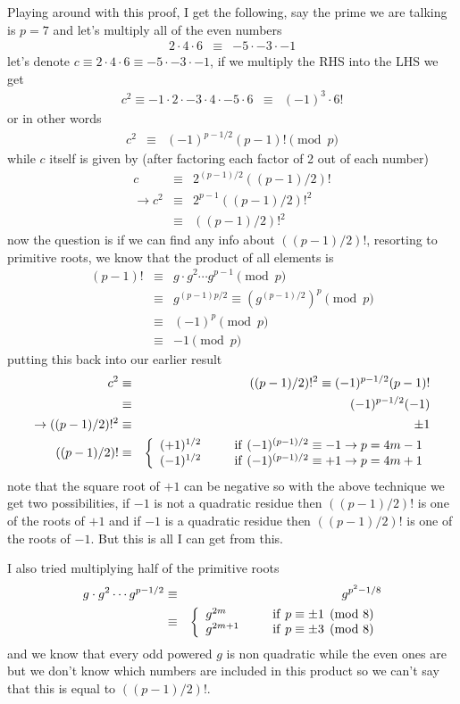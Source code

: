 \documentclass[aps,preprint,preprintnumbers,nofootinbib,showpacs,prd]{revtex4-1}
\newcommand{\nbea}{\begin{eqnarray*}}
\newcommand{\neea}{\end{eqnarray*}}
\begin{document}
Playing around with this proof, I get the following, say the prime we are talking is $p=7$ and let's multiply all of the even numbers
%
\nbea
2 \cdot 4 \cdot 6 & \equiv & -5 \cdot -3 \cdot -1
\neea
%
let's denote $c \equiv 2 \cdot 4 \cdot 6 \equiv -5 \cdot -3 \cdot -1$, if we multiply the RHS into the LHS we get
%
\nbea
c^2 \equiv -1 \cdot 2 \cdot -3 \cdot 4 \cdot -5 \cdot 6 & \equiv & (-1)^3 \cdot 6!
\neea
%
or in other words
%
\nbea
c^2 & \equiv & (-1)^{p-1/2} (p-1)! \pmod{p}
\neea
%
while $c$ itself is given by (after factoring each factor of 2 out of each number)
%
\nbea
c & \equiv & 2^{(p-1)/2} ((p-1)/2)! \\
\to c^2 & \equiv & 2^{p-1} ((p-1)/2)!^2 \\
& \equiv & ((p-1)/2)!^2
\neea
%
now the question is if we can find any info about $ ((p-1)/2)!$, resorting to primitive roots, we know that the product of all elements is
%
\nbea
(p-1)! & \equiv & g \cdot g^2 \cdots g^{p-1} \pmod{p} \\
& \equiv & g^{(p-1)p/2} \equiv (g^{(p-1)/2})^p \pmod{p} \\
& \equiv & (-1)^p \pmod{p} \\
& \equiv & -1 \pmod{p}
\neea
%
putting this back into our earlier result
%
\nbea
c^2 & \equiv & ((p-1)/2)!^2 \equiv  (-1)^{p-1/2}(p-1)! \\
& \equiv & (-1)^{p-1/2} (-1) \\
\to  ((p-1)/2)!^2 & \equiv & \pm 1 \\
((p-1)/2)! & \equiv & \left \{ 
\begin{array}{r l}
(+1)^{1/2} & ~~~~~{\rm if ~}(-1)^{(p-1)/2} \equiv -1 \to p = 4m - 1 \\
(-1)^{1/2} & ~~~~~{\rm if ~}(-1)^{(p-1)/2} \equiv +1 \to p = 4m + 1
\end{array}
\right.
\neea
%
note that the square root of $+1$ can be negative so with the above technique we get two possibilities, if $-1$ is not a quadratic residue then $((p-1)/2)!$ is one of the roots of $+1$ and if $-1$ is a quadratic residue then $((p-1)/2)!$ is one of the roots of $-1$. But this is all I can get from this.

I also tried multiplying half of the primitive roots
%
\nbea
g \cdot g^2 \cdots g^{p-1/2} & \equiv & g^{p^2-1/8} \\
& \equiv & \left\{
\begin{array}{l l}
g^{2m} & ~~~~~ {\rm if ~} p \equiv \pm 1 \pmod{8} \\
g^{2m+1} & ~~~~~ {\rm if ~} p \equiv \pm 3 \pmod{8}
\end{array}\right.
\neea
%
and we know that every odd powered $g$ is non quadratic while the even ones are but we don't know which numbers are included in this product so we can't say that this is equal to $((p-1)/2)!$.
\end{document}
